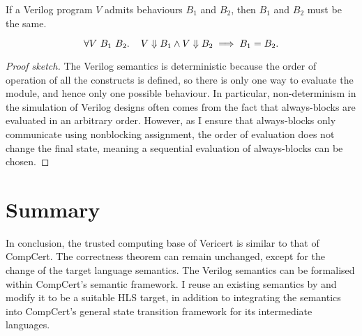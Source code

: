 \begin{lemma}\label{lemma:deterministic}
  If a Verilog program $V\!$ admits behaviours $B_1$ and $B_2$, then $B_1$ and
  $B_2$ must be the same.

  {\normalfont\begin{equation}
    \forall V\ B_{1}\ B_{2}\ldotp\quad V \Downarrow B_{1} \land V \Downarrow B_{2} \implies B_{1} = B_{2}.
  \end{equation}}
\end{lemma}

\begin{proof}[Proof sketch]
  The Verilog semantics is deterministic because the order of operation of all
  the constructs is defined, so there is only one way to evaluate the module,
  and hence only one possible behaviour.  In particular, non-determinism in the
  simulation of Verilog designs often comes from the fact that always-blocks are
  evaluated in an arbitrary order.  However, as I ensure that always-blocks only
  communicate using nonblocking assignment, the order of evaluation does not
  change the final state, meaning a sequential evaluation of always-blocks can
  be chosen.
\end{proof}

\section{Summary}

In conclusion, the trusted computing base of Vericert is similar to that of
CompCert.  The correctness theorem can remain unchanged, except for the change
of the target language semantics.  The Verilog semantics can be formalised
within CompCert's semantic framework.  I reuse an existing semantics by
\textcite{lööw19_proof_trans_veril_devel_hol} and modify it to be a suitable
\gls{HLS} target, in addition to integrating the semantics into CompCert's
general state transition framework for its intermediate languages.

